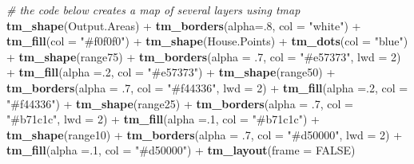 \documentclass[]{article}
\newenvironment{Shaded}{}{}
\newcommand{\CommentTok}[1]{\textcolor[rgb]{0.38,0.63,0.69}{\textit{#1}}}
\newcommand{\DataTypeTok}[1]{\textcolor[rgb]{0.56,0.13,0.00}{#1}}
\newcommand{\DecValTok}[1]{\textcolor[rgb]{0.25,0.63,0.44}{#1}}
\newcommand{\FloatTok}[1]{\textcolor[rgb]{0.25,0.63,0.44}{#1}}
\newcommand{\KeywordTok}[1]{\textcolor[rgb]{0.00,0.44,0.13}{\textbf{#1}}}
\newcommand{\NormalTok}[1]{#1}
\newcommand{\OperatorTok}[1]{\textcolor[rgb]{0.40,0.40,0.40}{#1}}
\newcommand{\OtherTok}[1]{\textcolor[rgb]{0.00,0.44,0.13}{#1}}
\newcommand{\StringTok}[1]{\textcolor[rgb]{0.25,0.44,0.63}{#1}}
\begin{document}
\begin{Shaded}
\begin{Highlighting}[]
\CommentTok{# the code below creates a map of several layers using tmap}
\KeywordTok{tm_shape}\NormalTok{(Output.Areas) }\OperatorTok{+}\StringTok{ }\KeywordTok{tm_borders}\NormalTok{(}\DataTypeTok{alpha=}\NormalTok{.}\DecValTok{8}\NormalTok{, }\DataTypeTok{col =} \StringTok{"white"}\NormalTok{) }\OperatorTok{+}
\StringTok{    }\KeywordTok{tm_fill}\NormalTok{(}\DataTypeTok{col =} \StringTok{"#f0f0f0"}\NormalTok{) }\OperatorTok{+}\StringTok{ }
\StringTok{  }\KeywordTok{tm_shape}\NormalTok{(House.Points) }\OperatorTok{+}\StringTok{ }\KeywordTok{tm_dots}\NormalTok{(}\DataTypeTok{col =} \StringTok{"blue"}\NormalTok{) }\OperatorTok{+}\StringTok{ }
\StringTok{  }\KeywordTok{tm_shape}\NormalTok{(range75) }\OperatorTok{+}\StringTok{ }\KeywordTok{tm_borders}\NormalTok{(}\DataTypeTok{alpha =} \FloatTok{.7}\NormalTok{, }\DataTypeTok{col =} \StringTok{"#e57373"}\NormalTok{, }\DataTypeTok{lwd =} \DecValTok{2}\NormalTok{) }\OperatorTok{+}
\StringTok{    }\KeywordTok{tm_fill}\NormalTok{(}\DataTypeTok{alpha =}\NormalTok{.}\DecValTok{2}\NormalTok{, }\DataTypeTok{col =} \StringTok{"#e57373"}\NormalTok{) }\OperatorTok{+}
\StringTok{  }\KeywordTok{tm_shape}\NormalTok{(range50) }\OperatorTok{+}\StringTok{ }\KeywordTok{tm_borders}\NormalTok{(}\DataTypeTok{alpha =} \FloatTok{.7}\NormalTok{, }\DataTypeTok{col =} \StringTok{"#f44336"}\NormalTok{, }\DataTypeTok{lwd =} \DecValTok{2}\NormalTok{) }\OperatorTok{+}
\StringTok{    }\KeywordTok{tm_fill}\NormalTok{(}\DataTypeTok{alpha =}\NormalTok{.}\DecValTok{2}\NormalTok{, }\DataTypeTok{col =} \StringTok{"#f44336"}\NormalTok{) }\OperatorTok{+}
\StringTok{  }\KeywordTok{tm_shape}\NormalTok{(range25) }\OperatorTok{+}\StringTok{ }\KeywordTok{tm_borders}\NormalTok{(}\DataTypeTok{alpha =} \FloatTok{.7}\NormalTok{, }\DataTypeTok{col =} \StringTok{"#b71c1c"}\NormalTok{, }\DataTypeTok{lwd =} \DecValTok{2}\NormalTok{) }\OperatorTok{+}
\StringTok{    }\KeywordTok{tm_fill}\NormalTok{(}\DataTypeTok{alpha =}\NormalTok{.}\DecValTok{1}\NormalTok{, }\DataTypeTok{col =} \StringTok{"#b71c1c"}\NormalTok{) }\OperatorTok{+}
\StringTok{  }\KeywordTok{tm_shape}\NormalTok{(range10) }\OperatorTok{+}\StringTok{ }\KeywordTok{tm_borders}\NormalTok{(}\DataTypeTok{alpha =} \FloatTok{.7}\NormalTok{, }\DataTypeTok{col =} \StringTok{"#d50000"}\NormalTok{, }\DataTypeTok{lwd =} \DecValTok{2}\NormalTok{) }\OperatorTok{+}
\StringTok{    }\KeywordTok{tm_fill}\NormalTok{(}\DataTypeTok{alpha =}\NormalTok{.}\DecValTok{1}\NormalTok{, }\DataTypeTok{col =} \StringTok{"#d50000"}\NormalTok{) }\OperatorTok{+}
\StringTok{  }\KeywordTok{tm_layout}\NormalTok{(}\DataTypeTok{frame =} \OtherTok{FALSE}\NormalTok{)}
\end{Highlighting}
\end{Shaded}
\end{document}
